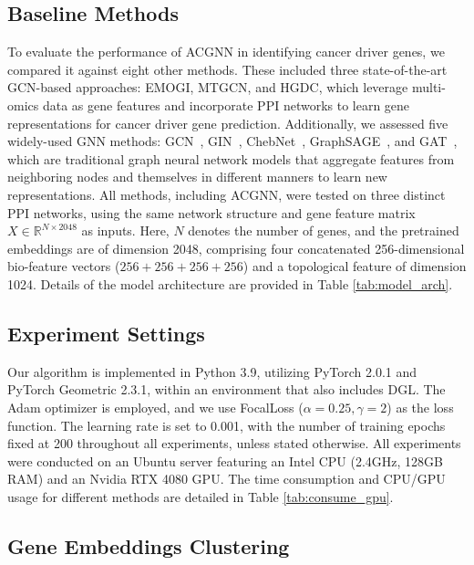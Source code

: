 

\subsection{Baseline Methods}

To evaluate the performance of ACGNN in identifying cancer driver genes, we compared it against eight other methods. These included three state-of-the-art GCN-based approaches: EMOGI, MTGCN, and HGDC, which leverage multi-omics data as gene features and incorporate PPI networks to learn gene representations for cancer driver gene prediction. Additionally, we assessed five widely-used GNN methods: GCN~\cite{kipf2017semi}, GIN~\cite{xu2018powerful}, ChebNet~\cite{defferrard2016convolutional}, GraphSAGE~\cite{hamilton2017inductive}, and GAT~\cite{velickovic2018graph}, which are traditional graph neural network models that aggregate features from neighboring nodes and themselves in different manners to learn new representations. All methods, including ACGNN, were tested on three distinct PPI networks, using the same network structure and gene feature matrix \( X \in \mathbb{R}^{N \times 2048} \) as inputs. Here, \( N \) denotes the number of genes, and the pretrained embeddings are of dimension 2048, comprising four concatenated 256-dimensional bio-feature vectors (\( 256 + 256 + 256 + 256 \)) and a topological feature of dimension 1024. Details of the model architecture are provided in Table \ref{tab:model_arch}.

\subsection{Experiment Settings}

Our algorithm is implemented in Python 3.9, utilizing PyTorch 2.0.1 and PyTorch Geometric 2.3.1, within an environment that also includes DGL. The Adam optimizer is employed, and we use FocalLoss (\( \alpha = 0.25, \gamma = 2 \)) as the loss function. The learning rate is set to 0.001, with the number of training epochs fixed at 200 throughout all experiments, unless stated otherwise. All experiments were conducted on an Ubuntu server featuring an Intel CPU (2.4GHz, 128GB RAM) and an Nvidia RTX 4080 GPU. The time consumption and CPU/GPU usage for different methods are detailed in Table \ref{tab:consume_gpu}.


\subsection{Gene Embeddings Clustering}


